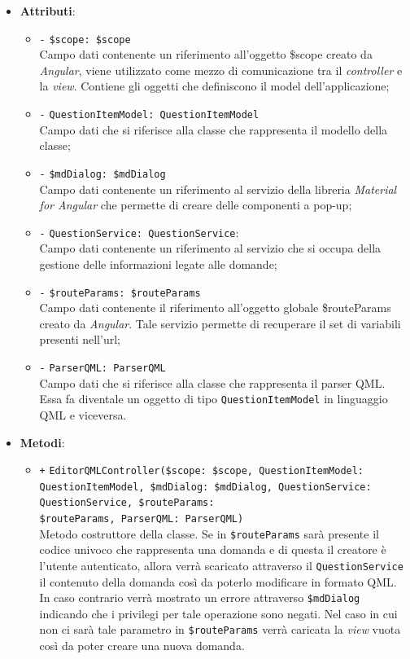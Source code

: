 \begin{itemize}
	\item \textbf{Attributi}:
	\begin{itemize}
		\item \texttt{-} \texttt{\$scope: \$scope} \\
		Campo dati contenente un riferimento all'oggetto \$scope creato da \textit{Angular}, viene utilizzato come mezzo di comunicazione tra il \textit{controller} e la \textit{view}. Contiene gli oggetti che definiscono il model dell'applicazione;
		\item \texttt{-} \texttt{QuestionItemModel: QuestionItemModel} \\
		Campo dati che si riferisce alla classe che rappresenta il modello della classe;
		\item \texttt{-} \texttt{\$mdDialog: \$mdDialog} \\
		Campo dati contenente un riferimento al servizio della libreria \textit{Material for Angular} che permette di creare delle componenti a pop-up;
		\item \texttt{-} \texttt{QuestionService: QuestionService}: \\
		Campo dati contenente un riferimento al servizio che si occupa della gestione delle informazioni legate alle domande; 
		\item \texttt{-} \texttt{\$routeParams: \$routeParams} \\
		Campo dati contenente il riferimento all'oggetto globale \$routeParams creato da \textit{Angular}. Tale servizio permette di recuperare il set di variabili presenti nell'url; 
		\item \texttt{-} \texttt{ParserQML: ParserQML} \\
		Campo dati che si riferisce alla classe che rappresenta il parser QML. Essa fa diventale un oggetto di tipo \texttt{QuestionItemModel} in linguaggio QML e viceversa.
	\end{itemize}
	\item \textbf{Metodi}:
	\begin{itemize}
		\item \texttt{+} \texttt{EditorQMLController(\$scope: \$scope, QuestionItemModel: QuestionItemModel, \$mdDialog: \$mdDialog, QuestionService: QuestionService, \$routeParams:\\ \$routeParams, ParserQML: ParserQML)} \\ 
		Metodo costruttore della classe. Se in \texttt{\$routeParams} sarà presente il codice univoco che rappresenta una domanda e di questa il creatore è l'utente autenticato, allora verrà scaricato attraverso il \texttt{QuestionService} il contenuto della domanda così da poterlo modificare in formato QML. In caso contrario verrà mostrato un errore attraverso \texttt{\$mdDialog} indicando che i privilegi per tale operazione sono negati. Nel caso in cui non ci sarà tale parametro in \texttt{\$routeParams} verrà caricata la \textit{view} vuota così da poter creare una nuova domanda. \\

\end{itemize}
\end{itemize}

